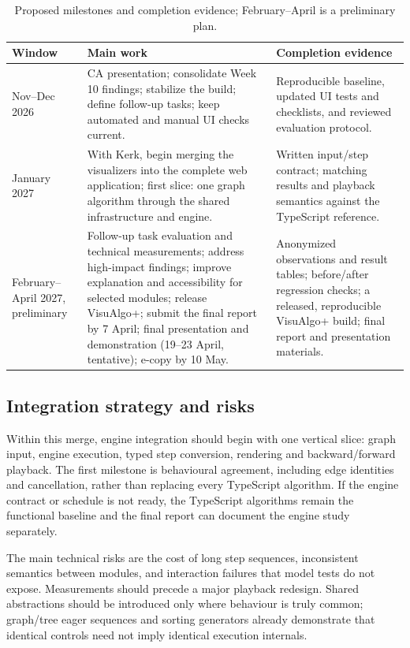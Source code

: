 \documentclass[11pt,a4paper]{article}
\begin{document}
\begin{table}[tbp]\small\centering
\caption{Proposed milestones and completion evidence; February--April is a preliminary plan.}\label{tab:plan}
\begin{tabularx}{\linewidth}{@{}>{\raggedright\arraybackslash}p{20mm}>{\raggedright\arraybackslash}X>{\raggedright\arraybackslash}X@{}}\toprule
Window & Main work & Completion evidence\\\midrule
Nov--Dec 2026 & CA presentation; consolidate Week 10 findings; stabilize the build; define follow-up tasks; keep automated and manual UI checks current. & Reproducible baseline, updated UI tests and checklists, and reviewed evaluation protocol.\\
January 2027 & With Kerk, begin merging the visualizers into the complete web application; first slice: one graph algorithm through the shared infrastructure and engine. & Written input/step contract; matching results and playback semantics against the TypeScript reference.\\
February--April 2027, preliminary & Follow-up task evaluation and technical measurements; address high-impact findings; improve explanation and accessibility for selected modules; release VisuAlgo+; submit the final report by 7 April; final presentation and demonstration (19--23 April, tentative); e-copy by 10 May. & Anonymized observations and result tables; before/after regression checks; a released, reproducible VisuAlgo+ build; final report and presentation materials.\\\bottomrule
\end{tabularx}
\end{table}

\subsection{Integration strategy and risks}
Within this merge, engine integration should begin with one vertical slice: graph input, engine execution, typed step conversion, rendering and backward/forward playback. The first milestone is behavioural agreement, including edge identities and cancellation, rather than replacing every TypeScript algorithm. If the engine contract or schedule is not ready, the TypeScript algorithms remain the functional baseline and the final report can document the engine study separately.

The main technical risks are the cost of long step sequences, inconsistent semantics between modules, and interaction failures that model tests do not expose. Measurements should precede a major playback redesign. Shared abstractions should be introduced only where behaviour is truly common; graph/tree eager sequences and sorting generators already demonstrate that identical controls need not imply identical execution internals.
\end{document}
